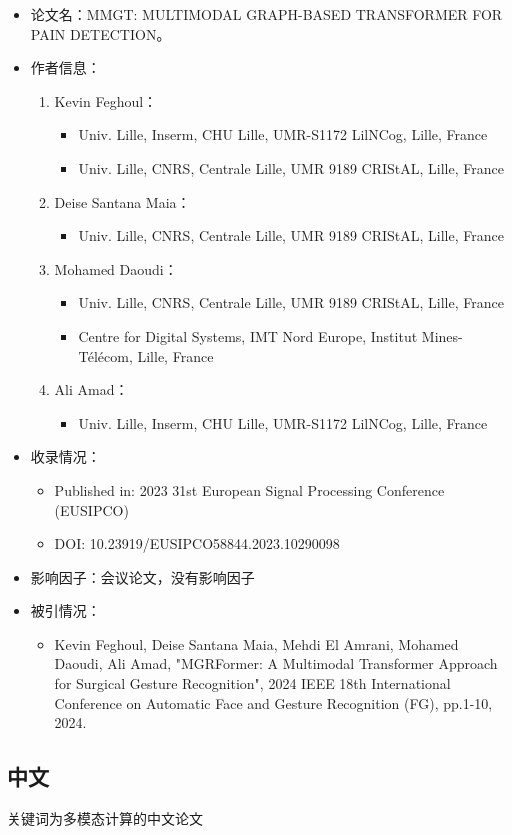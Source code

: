 \begin{itemize}
    \item 论文名：MMGT: MULTIMODAL GRAPH-BASED TRANSFORMER FOR PAIN DETECTION。
    \item 作者信息：
        \begin{enumerate}
            \item Kevin Feghoul：
                \begin{itemize}
                    \item Univ. Lille, Inserm, CHU Lille, UMR-S1172 LilNCog, Lille, France
                    \item Univ. Lille, CNRS, Centrale Lille, UMR 9189 CRIStAL, Lille, France 
                \end{itemize}
            \item Deise Santana Maia：
                \begin{itemize}
                    \item Univ. Lille, CNRS, Centrale Lille, UMR 9189 CRIStAL, Lille, France
                \end{itemize}

            \item Mohamed Daoudi：
                \begin{itemize}
                    \item Univ. Lille, CNRS, Centrale Lille, UMR 9189 CRIStAL, Lille, France
                    \item Centre for Digital Systems, IMT Nord Europe, Institut Mines-Télécom, Lille, France
                \end{itemize}

            \item Ali Amad：
                \begin{itemize}
                    \item Univ. Lille, Inserm, CHU Lille, UMR-S1172 LilNCog, Lille, France
                \end{itemize}
        \end{enumerate}

    \item 收录情况：
        \begin{itemize}
            \item Published in: 2023 31st European Signal Processing Conference (EUSIPCO)
            \item DOI: 10.23919/EUSIPCO58844.2023.10290098
        \end{itemize}

    \item 影响因子：会议论文，没有影响因子
    \item 被引情况：
        \begin{itemize}
            \item Kevin Feghoul, Deise Santana Maia, Mehdi El Amrani, Mohamed Daoudi, Ali Amad, "MGRFormer: A Multimodal Transformer Approach for Surgical Gesture Recognition", 2024 IEEE 18th International Conference on Automatic Face and Gesture Recognition (FG), pp.1-10, 2024.
        \end{itemize}
\end{itemize}



\subsection{中文}
关键词为多模态计算的中文论文

